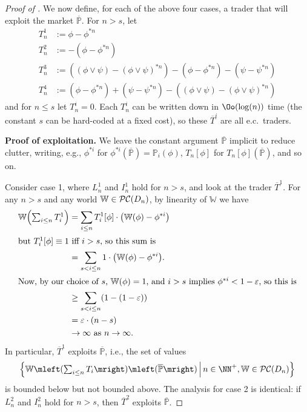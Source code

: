 \documentclass[authordate,onecolumn,noenvironments]{miri-tech-article}
\numberwithin{equation}{subsection}
\newcommand{\seq}[1]{{\overline{#1}}}
\newcommand{\nn}{n}
\newcommand{\ec}[1][\ ]{e.c.#1}
\newcommand{\tinysection}[1]{\medskip\noindent\textbf{#1.}}
\newcommand{\trade}{T}%
\newcommand{\Trader}{\seq{\trade}} %
\newcommand{\strat}{T} %
\newcommand{\BelState}{\mathbb{P}}
\newcommand{\pt}{\BelState}
\newcommand{\MP}{\seq{\pt}}
\newcommand{\dt}{D}
\newcommand{\pcworlds}{\mathcal{P\-C}}
\newcommand{\World}{\mathbb{W}}
\begin{document}
\begin{proof}[Proof of ]
  We now define, for each of the above four cases, a trader that will exploit the market $\MP$.  For $n>s$, let
  \begin{align*}
    \strat^1_\nn &:= \phi-\phi^{*\nn}\\
    \strat^2_\nn &:= -(\phi-\phi^{*\nn})\\
    \strat^3_\nn &:=  \left((\phi \lor \psi)-(\phi \lor \psi)^{*\nn}\right)-(\phi-\phi^{*\nn}) -(\psi-\psi^{*\nn})\\
    \strat^4_\nn &:=  (\phi-\phi^{*\nn})+(\psi-\psi^{*\nn}) -\left((\phi \lor \psi)-(\phi \lor \psi)^{*\nn}\right)
  \end{align*}
  and for $\nn\le s$ let $\strat^i_\nn = 0$. Each $\trade^i_\nn$ can be written down in $\Oo(\log(\nn))$ time (the constant $s$ can be hard-coded at a fixed cost), so these $\Trader^i$ are all \ec traders.

  \tinysection{Proof of exploitation} 
We leave the constant argument $\MP$ implicit to reduce clutter, writing, e.g., $\phi^{*i}$ for $\phi^{*i}(\MP) = \pt_i(\phi)$, $\strat_\nn[\phi]$ for $\strat_\nn[\phi](\MP)$, and so on.

  Consider case 1, where $L^1_\nn$ and $I^1_\nn$ hold for $\nn>s$, and look at the trader $\Trader^1$.  For any $n>s$ and any world $\World\in\pcworlds(\dt_\nn)$, by linearity of $\World$ we have
  \begin{align*}
    \World\mleft({\textstyle \sum_{i \leq n} \strat^1_i}\mright) 
    &= \sum_{i \le \nn} \strat^1_i[\phi] \cdot \mleft(\World(\phi) - \phi^{*i} \mright)\\
    \shortintertext{but $\strat^1_i[\phi]\equiv 1$ iff $i>s$, so this sum is}
    &= \sum_{s < i \le \nn} 1  \cdot \mleft( \World(\phi) - \phi^{*i} \mright) .\\
    \shortintertext{Now, by our choice of $s$, $\World(\phi) = 1$, and $i>s$ implies $\phi^{*i} < 1-\varepsilon$, so this is}
    &\geq \sum_{s < i \le \nn}  \mleft( 1 - (1-\varepsilon) \mright) \\
    &= \varepsilon\cdot(\nn -s)\\
    &\to \infty \text{ as } \nn\to\infty.
  \end{align*}
  In particular, $\Trader^1$ exploits $\MP$, i.e., the set of values
  \[
    \left\{ \World\mleft({\textstyle \sum_{i \leq n} \strat_i}\mright)\mleft(\MP \mright) \,\middle|\, \nn\in\NN^+, \World\in\pcworlds(\dt_\nn) \right\}
  \]
  is bounded below but not bounded above.  The analysis for case 2 is identical: if $L^2_\nn$ and $I^2_\nn$ hold for $\nn>s$, then $\Trader^2$ exploits $\MP$.


\end{proof}
\end{document}
